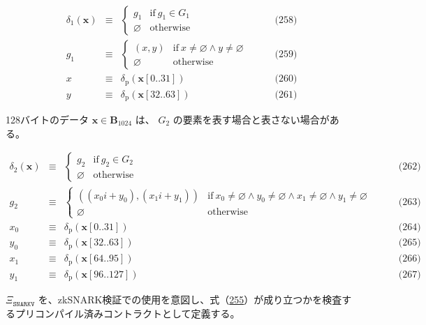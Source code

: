 \documentclass[
]{ltjsarticle}
\begin{document}
\[\begin{aligned}
\delta_1(\mathbf{x})&\equiv&\begin{cases}
g_1&\text{if}\ g_1\in G_1\\
\varnothing&\text{otherwise}
\end{cases} & \qquad \text{(258)} \\
g_1&\equiv&\begin{cases}
(x,y)&\text{if}\ x\neq\varnothing\wedge y\neq\varnothing\\
\varnothing&\text{otherwise}
\end{cases} & \qquad \text{(259)} \\
x&\equiv&\delta_{\mathrm{p}}(\mathbf{x}[0..31]) & \qquad \text{(260)} \\
y&\equiv&\delta_{\mathrm{p}}(\mathbf{x}[32..63]) & \qquad \text{(261)}
\end{aligned}\]

128バイトのデータ \(\mathbf{x}\in\mathbf{B}_{1024}\) は、 \(G_2\)
の要素を表す場合と表さない場合がある。

\protect\hypertarget{eq-262}{}{}\protect\hypertarget{eq-263}{}{}\protect\hypertarget{eq-264}{}{}\protect\hypertarget{eq-265}{}{}\protect\hypertarget{eq-266}{}{}\protect\hypertarget{eq-267}{}{}

\[\begin{aligned}
\delta_2(\mathbf{x})&\equiv&\begin{cases}
g_2&\text{if}\ g_2\in G_2\\
\varnothing&\text{otherwise}
\end{cases} & \qquad \text{(262)} \\
g_2&\equiv&\begin{cases}
((x_0i+y_0),(x_1i+y_1))&\text{if}\ x_0\neq\varnothing\wedge y_0\neq\varnothing\wedge x_1\neq\varnothing\wedge y_1\neq\varnothing\\
\varnothing&\text{otherwise}
\end{cases} & \qquad \text{(263)} \\
x_0&\equiv&\delta_{\mathrm{p}}(\mathbf{x}[0..31]) & \qquad \text{(264)} \\
y_0&\equiv&\delta_{\mathrm{p}}(\mathbf{x}[32..63]) & \qquad \text{(265)} \\
x_1&\equiv&\delta_{\mathrm{p}}(\mathbf{x}[64..95]) & \qquad \text{(266)} \\
y_1&\equiv&\delta_{\mathrm{p}}(\mathbf{x}[96..127]) & \qquad \text{(267)}
\end{aligned}\]

\(\Xi_{\mathtt{SNARKV}}\)
を、zkSNARK検証での使用を意図し、式（\protect\hyperlink{eq:pairing-check}{255}）が成り立つかを検査するプリコンパイル済みコントラクトとして定義する。
\end{document}
